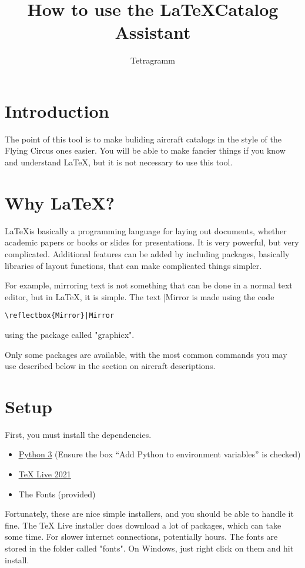 \documentclass{article}
\title{How to use the \LaTeX Catalog Assistant}
\author{Tetragramm}
\begin{document}
\maketitle
\section{Introduction}
The point of this tool is to make buliding aircraft catalogs in the style of the Flying Circus ones easier.  You will be able to make fancier things if you know and understand \LaTeX, but it is not necessary to use this tool.
\section{Why \LaTeX?}
\LaTeX is basically a programming language for laying out documents, whether academic papers or books or slides for presentations.  It is very powerful, but very complicated.  Additional features can be added by including packages, basically libraries of layout functions, that can make complicated things simpler.

For example, mirroring text is not something that can be done in a normal text editor, but in \LaTeX, it is simple.  The text |Mirror is made using the code \begin{verbatim}\reflectbox{Mirror}|Mirror\end{verbatim} using the package called "graphicx".

Only some packages are available, with the most common commands you may use described below in the section on aircraft descriptions.
\section{Setup}
First, you must install the dependencies.
\begin{itemize}
    \item \href{https://www.python.org/}{\color{blue}\underline{Python 3}}  (Ensure the box ``Add Python to environment variables'' is checked)
    \item \href{https://tug.org/texlive/}{\color{blue}\underline{TeX Live 2021}}
    \item The Fonts (provided)
\end{itemize}
Fortunately, these are nice simple installers, and you should be able to handle it fine.  The TeX Live installer does download a lot of packages, which can take some time.  For slower internet connections, potentially hours.  The fonts are stored in the folder called "fonts".  On Windows, just right click on them and hit install.
\end{document}
